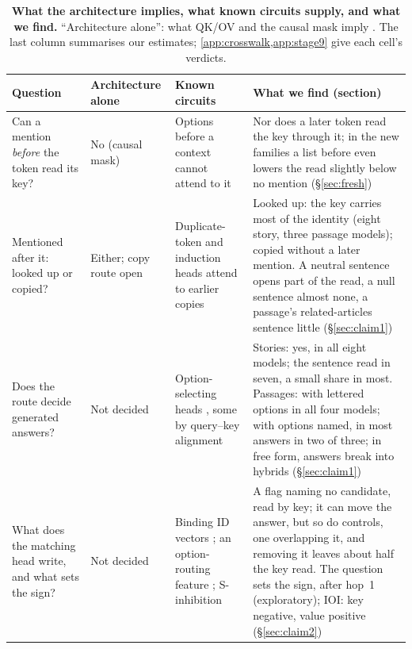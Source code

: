 \begin{table}[t]
  \centering
  \caption{\textbf{What the architecture implies, what known circuits supply, and what we find.} ``Architecture alone'': what QK/OV and the causal mask imply \citep{elhage2021framework}. The last column summarises our estimates; \cref{app:crosswalk,app:stage9} give each cell's verdicts.}
  \label{tab:qkov}
  \scriptsize\setlength{\tabcolsep}{3pt}
  \begin{tabular}{@{}p{}p{}p{}p{}@{}}
    \toprule
    Question & Architecture alone & Known circuits & What we find (section) \\
    \midrule
    \raggedright Can a mention \emph{before} the token read its key? & \raggedright No (causal mask) & \raggedright Options before a context cannot attend to it \citep{ok2026lost} & Nor does a later token read the key through it; in the new families a list before even lowers the read slightly below no mention (\S\ref{sec:fresh}) \\
    \raggedright Mentioned after it: looked up or copied? & \raggedright Either; copy route open & \raggedright Duplicate-token and induction heads attend to earlier copies \citep{wang2022ioi,olsson2022context} & Looked up: the key carries most of the identity (eight story, three passage models); copied without a later mention. A neutral sentence opens part of the read, a null sentence almost none, a passage's related-articles sentence little (\S\ref{sec:claim1}) \\
    \raggedright Does the route decide generated answers? & \raggedright Not decided & \raggedright Option-selecting heads \citep{wiegreffe2025answer}, some by query--key alignment \citep{tulchinskii2024wise} & Stories: yes, in all eight models; the sentence read in seven, a small share in most. Passages: with lettered options in all four models; with options named, in most answers in two of three; in free form, answers break into hybrids (\S\ref{sec:claim1}) \\
    \raggedright What does the matching head write, and what sets the sign? & \raggedright Not decided & \raggedright Binding ID vectors \citep{feng2023binding}; an option-routing feature \citep{sun2026persuaded}; S-inhibition \citep{wang2022ioi} & A flag naming no candidate, read by key; it can move the answer, but so do controls, one overlapping it, and removing it leaves about half the key read. The question sets the sign, after hop~1 (exploratory); IOI: key negative, value positive (\S\ref{sec:claim2}) \\

\end{tabular}
\end{table}
